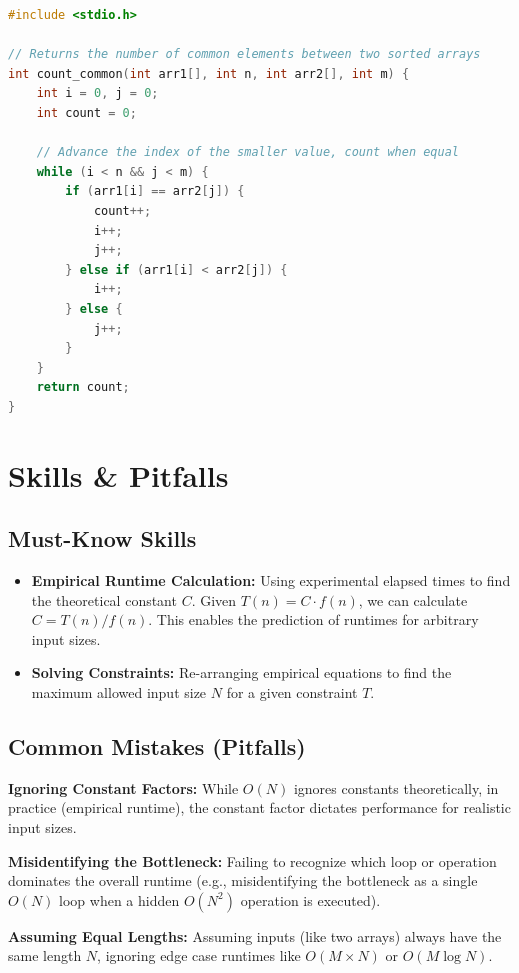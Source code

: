 \begin{lstlisting}[language=C, caption=Two-Pointer Strategy for Sorted Array Intersection]
#include <stdio.h>

// Returns the number of common elements between two sorted arrays
int count_common(int arr1[], int n, int arr2[], int m) {
    int i = 0, j = 0;
    int count = 0;

    // Advance the index of the smaller value, count when equal
    while (i < n && j < m) {
        if (arr1[i] == arr2[j]) {
            count++;
            i++;
            j++;
        } else if (arr1[i] < arr2[j]) {
            i++;
        } else {
            j++;
        }
    }
    return count;
}
\end{lstlisting}

\section{Skills \& Pitfalls}

\subsection{Must-Know Skills}
\begin{itemize}
    \item \textbf{Empirical Runtime Calculation:} Using experimental elapsed times to find the theoretical constant $C$. Given $T(n) = C \cdot f(n)$, we can calculate $C = T(n) / f(n)$. This enables the prediction of runtimes for arbitrary input sizes.
    \item \textbf{Solving Constraints:} Re-arranging empirical equations to find the maximum allowed input size $N$ for a given constraint $T$.
\end{itemize}

\subsection{Common Mistakes (Pitfalls)}

\begin{remark}
\textbf{Ignoring Constant Factors:} While $O(N)$ ignores constants theoretically, in practice (empirical runtime), the constant factor dictates performance for realistic input sizes.
\end{remark}

\begin{remark}
\textbf{Misidentifying the Bottleneck:} Failing to recognize which loop or operation dominates the overall runtime (e.g., misidentifying the bottleneck as a single $O(N)$ loop when a hidden $O(N^2)$ operation is executed).
\end{remark}

\begin{remark}
\textbf{Assuming Equal Lengths:} Assuming inputs (like two arrays) always have the same length $N$, ignoring edge case runtimes like $O(M \times N)$ or $O(M \log N)$.
\end{remark}
